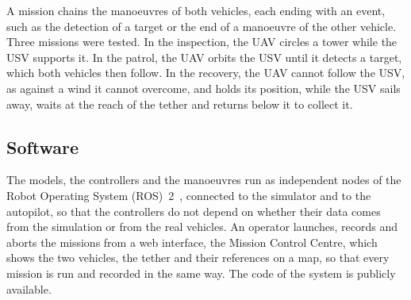A mission chains the manoeuvres of both vehicles, each ending with an event, such as the detection of a target or the end of a manoeuvre of the other vehicle. Three missions were tested. In the inspection, the UAV circles a tower while the USV supports it. In the patrol, the UAV orbits the USV until it detects a target, which both vehicles then follow. In the recovery, the UAV cannot follow the USV, as against a wind it cannot overcome, and holds its position, while the USV sails away, waits at the reach of the tether and returns below it to collect it.

\subsection{Software}

The models, the controllers and the manoeuvres run as independent nodes of the Robot Operating System (ROS)~2~\cite{macenski2022ros2}, connected to the simulator and to the autopilot, so that the controllers do not depend on whether their data comes from the simulation or from the real vehicles. An operator launches, records and aborts the missions from a web interface, the Mission Control Centre, which shows the two vehicles, the tether and their references on a map, so that every mission is run and recorded in the same way. The code of the system is publicly available\footnotemark[1].
